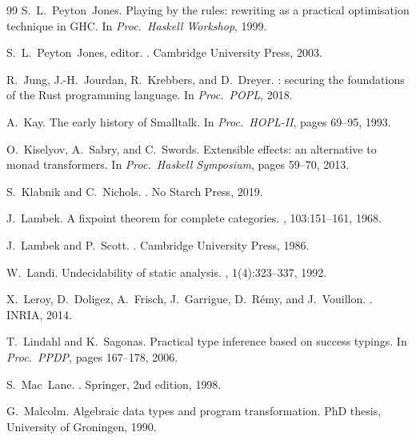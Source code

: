 \documentclass[11pt]{article}
\theoremstyle{definition}
\theoremstyle{remark}
\begin{document}
\begin{thebibliography}{99}
S.~L.~Peyton~Jones.
\newblock Playing by the rules: rewriting as a practical optimisation technique
  in {GHC}.
\newblock In {\em Proc.\ Haskell Workshop}, 1999.

S.~L.~Peyton~Jones, editor.
.
\newblock Cambridge University Press, 2003.

R.~Jung, J.-H.~Jourdan, R.~Krebbers, and D.~Dreyer.
: securing the foundations of the {Rust} programming
  language.
\newblock In {\em Proc.\ POPL}, 2018.

A.~Kay.
\newblock The early history of {Smalltalk}.
\newblock In {\em Proc.\ HOPL-II}, pages 69--95, 1993.

O.~Kiselyov, A.~Sabry, and C.~Swords.
\newblock Extensible effects: an alternative to monad transformers.
\newblock In {\em Proc.\ Haskell Symposium}, pages 59--70, 2013.

S.~Klabnik and C.~Nichols.
.
\newblock No Starch Press, 2019.

J.~Lambek.
\newblock A fixpoint theorem for complete categories.
, 103:151--161, 1968.

J.~Lambek and P.~Scott.
.
\newblock Cambridge University Press, 1986.

W.~Landi.
\newblock Undecidability of static analysis.
,
  1(4):323--337, 1992.

X.~Leroy, D.~Doligez, A.~Frisch, J.~Garrigue, D.~R\'{e}my, and J.~Vouillon.
.
\newblock INRIA, 2014.

T.~Lindahl and K.~Sagonas.
\newblock Practical type inference based on success typings.
\newblock In {\em Proc.\ PPDP}, pages 167--178, 2006.

S.~Mac~Lane.
.
\newblock Springer, 2nd edition, 1998.

G.~Malcolm.
\newblock Algebraic data types and program transformation.
\newblock PhD thesis, University of Groningen, 1990.


\end{thebibliography}
\end{document}
